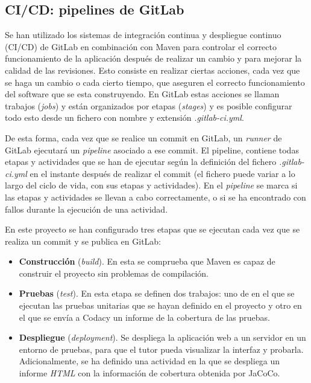 \subsection{CI/CD: pipelines de GitLab}

Se han utilizado los sistemas de integración continua y despliegue continuo (CI/CD) de GitLab en combinación con Maven para controlar el correcto funcionamiento de la aplicación después de realizar un cambio y para mejorar la calidad de las revisiones. Esto consiste en realizar ciertas acciones, cada vez que se haga un cambio o cada cierto tiempo, que aseguren el correcto funcionamiento del software que se esta construyendo. En GitLab estas acciones se llaman trabajos (\textit{jobs}) y están organizados por etapas (\textit{stages}) y es posible configurar todo esto desde un fichero con nombre y extensión \textit{.gitlab-ci.yml}. 

De esta forma, cada vez que se realice un commit en GitLab, un \textit{runner} de GitLab ejecutará un \textit{pipeline} asociado a ese commit. El pipeline, contiene todas etapas y actividades que se han de ejecutar según la definición del fichero \textit{.gitlab-ci.yml} en el instante después de realizar el commit (el fichero puede variar a lo largo del ciclo de vida, con sus etapas y actividades). En el \textit{pipeline} se marca si las etapas y actividades se llevan a cabo correctamente, o si se ha encontrado con fallos durante la ejecución de una actividad.

En este proyecto se han configurado tres etapas que se ejecutan cada vez que se realiza un commit y se publica en GitLab:
\begin{itemize}
	\item \textbf{Construcción} (\textit{build}). En esta se comprueba que Maven es capaz de construir el proyecto sin problemas de compilación.
	\item \textbf{Pruebas} (\textit{test}). En esta etapa se definen dos trabajos: uno de en el que se ejecutan las pruebas unitarias que se hayan definido en el proyecto y otro en el que se envía a Codacy un informe de la cobertura de las pruebas.
	\item \textbf{Despliegue} (\textit{deployment}). Se despliega la aplicación web a un servidor en un entorno de pruebas, para que el tutor pueda visualizar la interfaz y probarla. Adicionalmente, se ha definido una actividad en la que se despliega un informe \textit{HTML} con la información de cobertura obtenida por JaCoCo.
\end{itemize}

